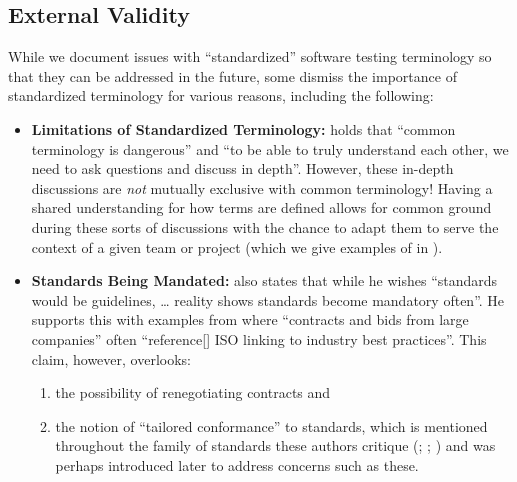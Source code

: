 \subsection{External Validity}\label{exter-valid}
While we document issues with
``standardized'' software testing terminology so that they can be addressed in
the future, some dismiss the importance of standardized terminology for various
reasons, including the following:
\begin{itemize}
    \item \textbf{Limitations of Standardized Terminology:} \citet{Schoots2014}
          holds that ``common terminology is dangerous'' and ``to be able to
          truly understand each other, we need to ask questions and discuss in
          depth''. However, these in-depth discussions are \emph{not} mutually
          exclusive with common terminology! Having a shared understanding for
          how terms are defined allows for common ground during these sorts of
          discussions with the chance to adapt them to serve the context of a
          given team or project (which we give examples of in
          ).
    \item \textbf{Standards Being Mandated:} \citet{Schoots2014} also states
          that while he wishes ``standards would be guidelines, \dots{} reality
          shows standards become mandatory often''. He supports this with
          examples from \citet{Soundararajan2015} where ``contracts and bids
          from large companies'' often ``reference[] ISO linking to industry
          best practices''. This claim, however, overlooks:
          \begin{enumerate}
              \item the possibility of renegotiating contracts and
              \item the notion of ``tailored conformance'' to standards, which
                    is mentioned throughout the family of standards these
                    authors critique (\citealp[pp.~9\=/10]{IEEE2021a};
                    \citeyear[pp.~5, 17, 37]{IEEE2021b};
                    \citeyear[p.~7]{IEEE2021c}) and was perhaps
                    introduced later to address concerns such as these.
          \end{enumerate}
\end{itemize}

